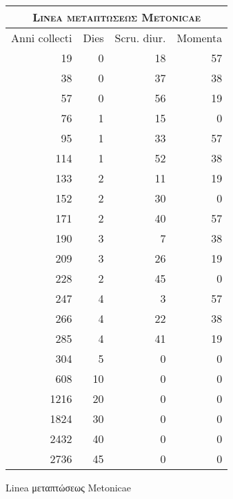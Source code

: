 %
\normalsize
\centering
\begin{tabular}{@{}r r r r@{}}
\toprule
\multicolumn{4}{c}{\Large\textsc{Linea \textgreek{μεταπτώσεως} Metonicae}}\\
\toprule
Anni collecti &
Dies &
Scru. diur. & %
Momenta
\\
\midrule
  19 &  0 & 18 & 57 \\
  38 &  0 & 37 & 38 \\
  57 &  0 & 56 & 19 \\
  76 &  1 & 15 &  0 \\
  95 &  1 & 33 & 57 \\
 114 &  1 & 52 & 38 \\
 133 &  2 & 11 & 19 \\
 152 &  2 & 30 &  0 \\
 171 &  2 & 40 & 57 \\
 190 &  3 &  7 & 38 \\
 209 &  3 & 26 & 19 \\
 228 &  2 & 45 &  0 \\
 247 &  4 &  3 & 57 \\
 266 &  4 & 22 & 38 \\
 285 &  4 & 41 & 19 \\
 304 &  5 &  0 &  0 \\
\midrule
 608 & 10 &  0 &  0 \\
1216 & 20 &  0 &  0 \\
1824 & 30 &  0 &  0 \\
2432 & 40 &  0 &  0 \\
2736 & 45 &  0 &  0 \\
\bottomrule
\end{tabular}
%
\caption{Linea \textgreek{μεταπτώσεως} Metonicae}
\label{tab:p82}
